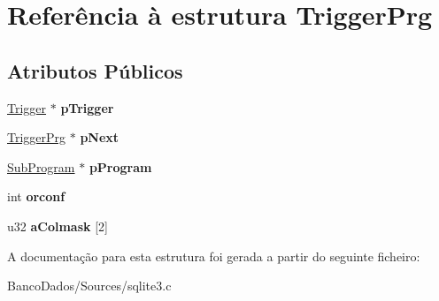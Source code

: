 \hypertarget{struct_trigger_prg}{\section{Referência à estrutura Trigger\-Prg}
\label{struct_trigger_prg}
}
\subsection*{Atributos Públicos}
\begin{DoxyCompactItemize}
\item 
\hypertarget{struct_trigger_prg_af70e5a74c954bc7a1eb8ee1162c40368}{\hyperlink{struct_trigger}{Trigger} $\ast$ {\bfseries p\-Trigger}}\label{struct_trigger_prg_af70e5a74c954bc7a1eb8ee1162c40368}

\item 
\hypertarget{struct_trigger_prg_a551b8a29a8c4ff785afab1596e5d8710}{\hyperlink{struct_trigger_prg}{Trigger\-Prg} $\ast$ {\bfseries p\-Next}}\label{struct_trigger_prg_a551b8a29a8c4ff785afab1596e5d8710}

\item 
\hypertarget{struct_trigger_prg_aa770aee270c7c5df85578dc4a6686134}{\hyperlink{struct_sub_program}{Sub\-Program} $\ast$ {\bfseries p\-Program}}\label{struct_trigger_prg_aa770aee270c7c5df85578dc4a6686134}

\item 
\hypertarget{struct_trigger_prg_aa475acda58c472b3491f6aa17020bf68}{int {\bfseries orconf}}\label{struct_trigger_prg_aa475acda58c472b3491f6aa17020bf68}

\item 
\hypertarget{struct_trigger_prg_aeac0a4cd1f1d287981ae33c4d171b614}{u32 {\bfseries a\-Colmask} \mbox{[}2\mbox{]}}\label{struct_trigger_prg_aeac0a4cd1f1d287981ae33c4d171b614}

\end{DoxyCompactItemize}


A documentação para esta estrutura foi gerada a partir do seguinte ficheiro\-:\begin{DoxyCompactItemize}
\item 
Banco\-Dados/\-Sources/sqlite3.\-c\end{DoxyCompactItemize}
